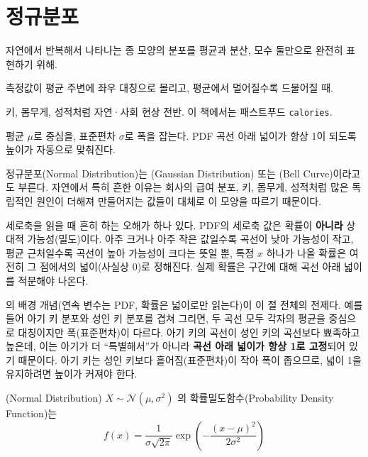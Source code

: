 \section{정규분포}
\label{sec:normal}

\begin{inbrief}
  \item[Why] 자연에서 반복해서 나타나는 종 모양의 분포를 평균과 분산,
             모수 둘만으로 완전히 표현하기 위해.
  \item[When] 측정값이 평균 주변에 좌우 대칭으로 몰리고, 평균에서 멀어질수록
              드물어질 때.
  \item[Where] 키, 몸무게, 성적처럼 자연·사회 현상 전반. 이 책에서는
               패스트푸드 \texttt{calories}.
  \item[How] 평균 $\mu$로 중심을, 표준편차 $\sigma$로 폭을 잡는다. PDF
             곡선 아래 넓이가 항상 1이 되도록 높이가 자동으로 맞춰진다.
\end{inbrief}

정규분포(Normal Distribution)는 (Gaussian Distribution)
또는 (Bell Curve)이라고도 부른다. 자연에서 특히 흔한
이유는 회사의 급여 분포, 키, 몸무게, 성적처럼 많은 독립적인 원인이 더해져
만들어지는 값들이 대체로 이 모양을 따르기 때문이다.

세로축을 읽을 때 흔히 하는 오해가 하나 있다. PDF의 세로축 값은
확률이 \textbf{아니라} 상대적 가능성(밀도)이다. 아주 크거나 아주 작은
값일수록 곡선이 낮아 가능성이 작고, 평균 근처일수록 곡선이 높아
가능성이 크다는 뜻일 뿐, 특정 $x$ 하나가 나올 확률은 여전히 그 점에서의
넓이(사실상 0)로 정해진다. 실제 확률은 구간에 대해 곡선 아래 넓이를
적분해야 나온다.

의 배경 개념(연속 변수는 PDF, 확률은 넓이로만
읽는다)이 이 절 전체의 전제다. 예를 들어 아기 키 분포와 성인 키 분포를
겹쳐 그리면, 두 곡선 모두 각자의 평균을 중심으로 대칭이지만 폭(표준편차)이
다르다. 아기 키의 곡선이 성인 키의 곡선보다 뾰족하고 높은데, 이는 아기가
더 ``특별해서''가 아니라 \textbf{곡선 아래 넓이가 항상 1로 고정}되어
있기 때문이다. 아기 키는 성인 키보다 흩어짐(표준편차)이 작아 폭이
좁으므로, 넓이 1을 유지하려면 높이가 커져야 한다.

\begin{definition}[정규분포]
\label{def:normal}
(Normal Distribution) $X \sim \mathcal{N}(\mu, \sigma^2)$ 의
확률밀도함수(Probability Density Function)는
\[
  f(x) = \frac{1}{\sigma\sqrt{2\pi}}
         \exp\!\left(-\frac{(x-\mu)^2}{2\sigma^2}\right)
\]
\end{definition}

